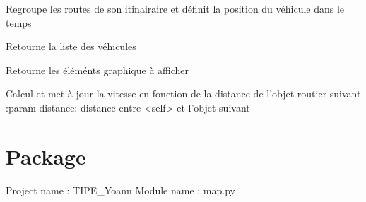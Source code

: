 \documentclass[a4paper,10pt,french]{sphinxmanual}
\begin{document}
\begin{fulllineitems}
\label{\detokenize{index:road_objects.vehicule.Vehicule}}
Regroupe les routes  de son itinairaire
et définit la position du véhicule dans le temps

\begin{fulllineitems}
\label{\detokenize{index:road_objects.vehicule.Vehicule.List_vehicules}}
Retourne la liste des véhicules

\end{fulllineitems}


\begin{fulllineitems}
\label{\detokenize{index:road_objects.vehicule.Vehicule.get_plot}}
Retourne les éléménts graphique à afficher

\end{fulllineitems}


\begin{fulllineitems}
\label{\detokenize{index:road_objects.vehicule.Vehicule.update_speed}}
Calcul et met à jour la vitesse en fonction de la distance de l’objet routier suivant
:param distance: distance entre \textless{}self\textgreater{} et l’objet suivant

\end{fulllineitems}


\end{fulllineitems}



\section{Package }
\label{\detokenize{index:package-roadmaps}}\label{\detokenize{index:module-roadmaps.map}}
Project name : TIPE\_Yoann
Module name : map.py
\end{document}
